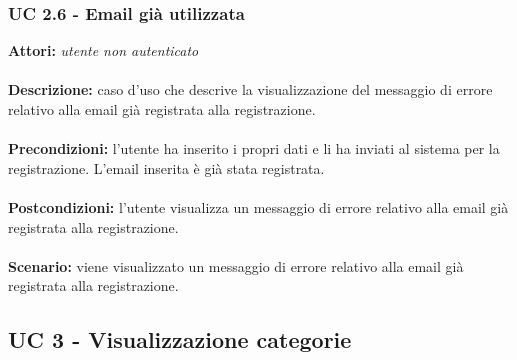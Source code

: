 \documentclass[a4paper,11pt]{article}
\begin{document}
\subsubsection{UC 2.6 - Email già utilizzata}

\textbf{Attori:} \textit{utente non autenticato}
\\ \\
\textbf{Descrizione:} caso d'uso che descrive la visualizzazione del messaggio di errore relativo alla email già registrata alla registrazione.\\
\\
\textbf{Precondizioni:} l'utente ha inserito i propri dati e li ha inviati al sistema per la registrazione. L'email inserita è già stata registrata.\\
\\
\textbf{Postcondizioni:} l’utente visualizza un messaggio di errore relativo alla email già registrata alla registrazione.\\
\\
\textbf{Scenario:} viene visualizzato un messaggio di errore relativo alla email già registrata alla registrazione.\\


\subsection{UC 3 - Visualizzazione categorie}
\end{document}
